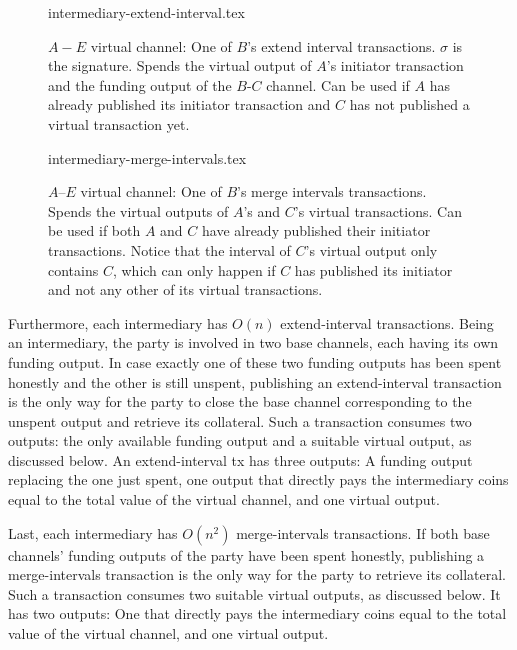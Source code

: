   \begin{figure}
    {intermediary-extend-interval.tex}
    \caption{$A-E$ virtual channel: One of $B$'s extend interval
    transactions. $\sigma$ is the signature. Spends the virtual output of $A$'s
    initiator transaction and the funding output of the $B$-$C$ channel. Can be
    used if $A$ has already published its initiator transaction and $C$ has not
    published a virtual transaction yet.}
    \label{figure:virtual-layer-extend-interval}
  \end{figure}

  \begin{figure}
    {intermediary-merge-intervals.tex}
    \caption{$A$--$E$ virtual channel: One of $B$'s merge intervals
    transactions. Spends the virtual outputs of $A$'s and $C$'s virtual
    transactions. Can be used if both $A$ and $C$ have already published their
    initiator transactions. Notice that the interval of $C$'s virtual output
    only contains $C$, which can only happen if $C$ has published its initiator
    and not any other of its virtual transactions.}
    \label{figure:virtual-layer-merge-intervals}
  \end{figure}

  Furthermore, each intermediary has $O(n)$ extend-interval transactions.
  Being an intermediary, the party is involved in two base channels, each having
  its own funding output. In case exactly one of these two funding outputs has
  been spent honestly and the other is still unspent,
  publishing an extend-interval transaction is the only way for the party to
  close the base channel corresponding to the unspent output and retrieve its
  collateral.
  Such a transaction consumes two outputs: the only
  available funding output and a suitable virtual output, as discussed below. An
  extend-interval tx has three outputs: A funding output replacing the one just
  spent, one output that directly pays the intermediary coins equal to the total
  value of the virtual channel, and one virtual output.

  Last, each intermediary has $O(n^2)$ merge-intervals transactions. If both
  base channels' funding outputs of the party have been spent honestly,
  publishing a merge-intervals
  transaction is the only way for the party to retrieve its collateral. Such a
  transaction consumes two suitable virtual outputs, as discussed below. It has
  two outputs: One that directly pays the intermediary coins equal to the total
  value of the virtual channel, and one virtual output.


